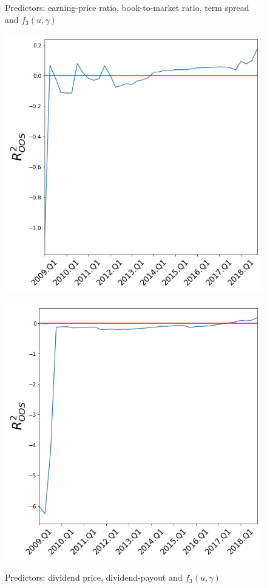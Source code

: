 \documentclass[a4paper,12pt,times,numbered,print,index]{report}
\numberwithin{equation}{section}
\begin{document}
	
	\begin{figure}[!htb]
		\begin{minipage}{0.48\textwidth}
			\centering
			\captionsetup{justification=centering,margin=0cm}
			\caption{Predictors: earning-price ratio, book-to-market ratio, term spread and $f_{3}( u,\gamma)$ }
			\includegraphics[width=0.9\linewidth]{plots/CV.png}
			
			\label{CV vs SM}%
		\end{minipage}\hfill
		\begin{minipage}{0.48\textwidth}
			\centering
			\captionsetup{justification=centering,margin=0cm}
			\caption{Predictors: dividend price, dividend-payout and $f_{3}( u,\gamma )$ }
			\includegraphics[width=0.9\linewidth]{plots/L.png}
			
			\label{L vs SM}%
		\end{minipage}
	\end{figure}
	
\end{document}
